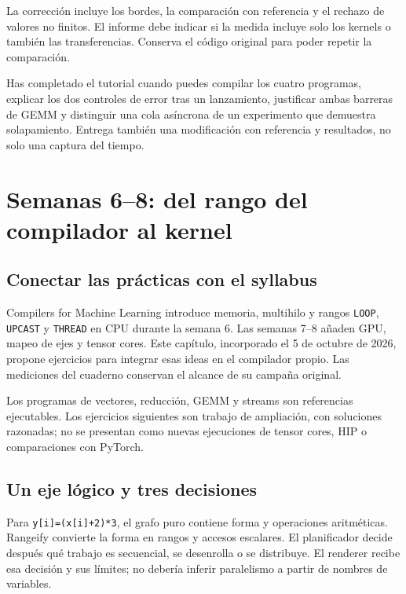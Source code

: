 \documentclass[12pt,a4paper,oneside]{report}
\begin{document}
La corrección incluye los bordes, la comparación con referencia y el rechazo de valores no finitos. El informe debe indicar si la medida incluye solo los kernels o también las transferencias. Conserva el código original para poder repetir la comparación.

\begin{comprueba}
Has completado el tutorial cuando puedes compilar los cuatro programas, explicar los dos controles de error tras un lanzamiento, justificar ambas barreras de GEMM y distinguir una cola asíncrona de un experimento que demuestra solapamiento. Entrega también una modificación con referencia y resultados, no solo una captura del tiempo.

\end{comprueba}
\chapter{Semanas 6--8: del rango del compilador al kernel}
\label{cuda:syllabus}
\section{Conectar las prácticas con el syllabus}
Compilers for Machine Learning introduce memoria, multihilo y rangos \texttt{LOOP}, \texttt{UPCAST} y \texttt{THREAD} en CPU durante la semana 6. Las semanas 7--8 añaden GPU, mapeo de ejes y tensor cores. Este capítulo, incorporado el 5 de octubre de 2026, propone ejercicios para integrar esas ideas en el compilador propio. Las mediciones del cuaderno conservan el alcance de su campaña original.

Los programas de vectores, reducción, GEMM y streams son referencias ejecutables. Los ejercicios siguientes son trabajo de ampliación, con soluciones razonadas; no se presentan como nuevas ejecuciones de tensor cores, HIP o comparaciones con PyTorch.

\section{Un eje lógico y tres decisiones}
Para \texttt{y[i]=(x[i]+2)*3}, el grafo puro contiene forma y operaciones aritméticas. Rangeify convierte la forma en rangos y accesos escalares. El planificador decide después qué trabajo es secuencial, se desenrolla o se distribuye. El renderer recibe esa decisión y sus límites; no debería inferir paralelismo a partir de nombres de variables.
\end{document}
